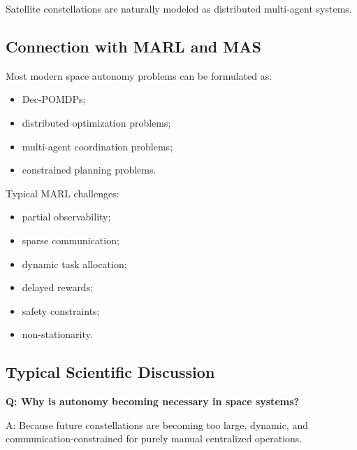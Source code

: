 \documentclass[10pt,a4paper,twocolumn]{article}
\begin{document}
\begin{keybox}
    Satellite constellations are naturally modeled as distributed multi-agent systems.
\end{keybox}


\subsection{Connection with MARL and MAS}

Most modern space autonomy problems can be formulated as:
\begin{itemize}
    \item Dec-POMDPs;
    \item distributed optimization problems;
    \item multi-agent coordination problems;
    \item constrained planning problems.
\end{itemize}

Typical MARL challenges:
\begin{itemize}
    \item partial observability;
    \item sparse communication;
    \item dynamic task allocation;
    \item delayed rewards;
    \item safety constraints;
    \item non-stationarity.
\end{itemize}


\subsection{Typical Scientific Discussion}

\begin{questionbox}
    \textbf{Q: Why is autonomy becoming necessary in space systems?}

    A: Because future constellations are becoming too large, dynamic, and communication-constrained for purely manual centralized operations.
\end{questionbox}
\end{document}
